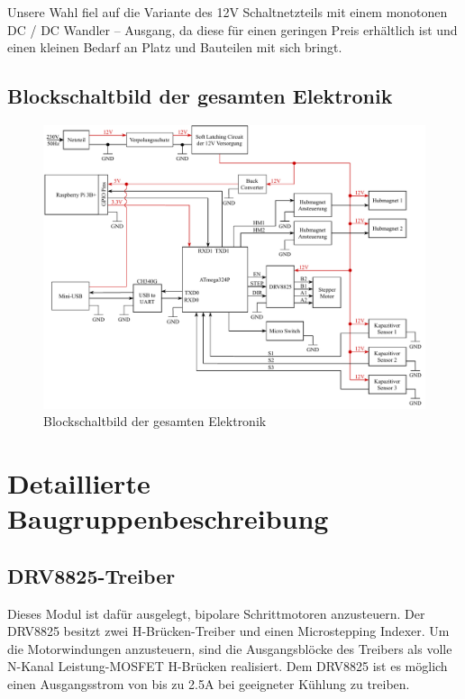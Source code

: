 Unsere Wahl fiel auf die Variante des 12V Schaltnetzteils mit einem monotonen DC / DC Wandler – Ausgang, da diese für einen geringen Preis erhältlich ist und einen kleinen Bedarf an Platz und Bauteilen mit sich bringt.
\newpage

\subsection{Blockschaltbild der gesamten Elektronik}

\begin{figure}[hb]
    \centering
    \includegraphics[scale=0.85,page=1]{fig/elektro/ElectroBlockDiagram.pdf}
    \caption{Blockschaltbild der gesamten Elektronik}
\end{figure}

\newpage
\section{Detaillierte Baugruppenbeschreibung}

\subsection{DRV8825-Treiber}
Dieses Modul ist dafür ausgelegt, bipolare Schrittmotoren anzusteuern. Der DRV8825 besitzt zwei H-Brücken-Treiber und einen Microstepping Indexer.
Um die Motorwindungen anzusteuern, sind die Ausgangsblöcke des Treibers als volle N-Kanal Leistung-MOSFET H-Brücken realisiert.
Dem DRV8825 ist es möglich einen Ausgangsstrom von bis zu 2.5A bei geeigneter Kühlung zu treiben.

